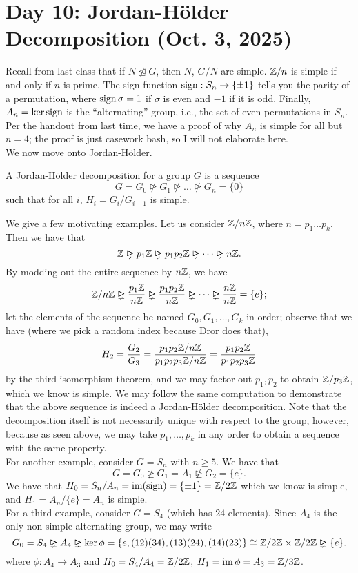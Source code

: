 \section{Day 10: Jordan-H\"older Decomposition (Oct. 3, 2025)}
Recall from last class that if $N \nunlhd G$, then $N$, $G/N$ are simple. $\mathbb Z/n$ is simple if and only if $n$ is prime. The sign function $\operatorname{sign} : S_n \to \{\pm 1\}$ tells you the parity of a permutation, where $\operatorname{sign} \sigma = 1$ if $\sigma$ is even and $-1$ if it is odd. Finally, $A_n = \ker \operatorname{sign}$ is the ``alternating'' group, i.e., the set of even permutations in $S_n$.
\\[8pt]
Per the \href{https://drorbn.net/AcademicPensieve/Classes/25-347-GroupsRingsFields/SimplicityOfAn.pdf}{handout} from last time, we have a proof of why $A_n$ is simple for all but $n = 4$; the proof is just casework bash, so I will not elaborate here. %
\\[8pt]
We now move onto Jordan-H\"older.
\begin{definition}
    A Jordan-H\"older decomposition for a group $G$ is a sequence
    \[ G = G_0 \nunrhd G_1 \nunrhd \dots \nunrhd G_n = \{0\} \]
    such that for all $i$, $H_i = G_i/G_{i+1}$ is simple.
\end{definition}
\noindent We give a few motivating examples. Let us consider $\mathbb Z/n\mathbb Z$, where $n = p_1 \dots p_k$. Then we have that
\[ \ZZ \nunrhd p_1 \ZZ \nunrhd p_1 p_2 \ZZ \nunrhd \dots \nunrhd n \ZZ. \]
By modding out the entire sequence by $n\mathbb Z$, we have
\[ \ZZ/n\ZZ \nunrhd \frac{p_1 \ZZ}{n\ZZ} \nunrhd \frac{p_1p_2 \ZZ}{n\ZZ} \nunrhd \dots \nunrhd \frac{n\ZZ}{n\ZZ} = \{e\}; \]
let the elements of the sequence be named $G_0, G_1, \dots, G_k$ in order; observe that we have (where we pick a random index because Dror does that),
\[ H_2 = \frac{G_2}{G_3} = \frac{p_1p_2 \mathbb Z / n\mathbb Z}{p_1p_2p_3 \mathbb Z / n\mathbb Z} = \frac{p_1p_2 \mathbb Z}{p_1p_2p_3 \mathbb Z} \]
by the third isomorphism theorem, and we may factor out $p_1, p_2$ to obtain $\mathbb Z/p_3\mathbb Z$, which we know is simple. We may follow the same computation to demonstrate that the above sequence is indeed a Jordan-H\"older decomposition. Note that the decomposition itself is not necessarily unique with respect to the group, however, because as seen above, we may take $p_1, \dots, p_k$ in any order to obtain a sequence with the same property.
\\[8pt]
For another example, consider $G = S_n$ with $n \geq 5$. We have that
\[ G = G_0 \nunrhd G_1 = A_1 \nunrhd G_2 = \{e\}. \]
We have that $H_0 = S_n/A_n = \operatorname{im}(\operatorname{sign}) = \{\pm 1\} = \mathbb Z/2\mathbb Z$ which we know is simple, and $H_1 = A_n/\{e\} = A_n$ is simple.
\\[8pt]
For a third example, consider $G = S_4$ (which has $24$ elements). Since $A_4$ is the only non-simple alternating group, we may write
\[ G_0 = S_4 \nunrhd A_4 \nunrhd \ker \phi = \{e, (12)(34), (13)(24), (14)(23)\} \cong \ZZ/2\ZZ \times \ZZ/2\ZZ \nunrhd \{e\}. \]
where $\phi : A_4 \to A_3$ and $H_0 = S_4/A_4 = \mathbb Z/2\mathbb Z$, $H_1 = \operatorname{im} \phi = A_3 = \mathbb Z/3\mathbb Z$. %
